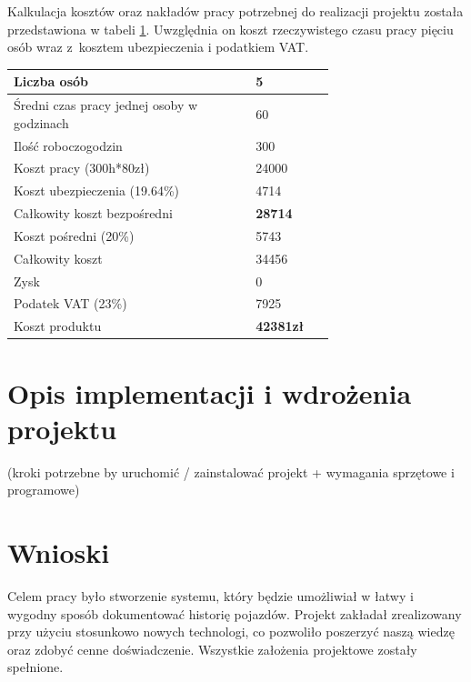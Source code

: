 \documentclass[12pt]{article}
\begin{document}
Kalkulacja kosztów oraz nakładów pracy potrzebnej do realizacji projektu została przedstawiona w tabeli \ref{kosztorys}. Uwzględnia on koszt rzeczywistego czasu pracy pięciu osób wraz z~kosztem ubezpieczenia i podatkiem VAT.

\begin{table}[H]
\begin{center}
\label{kosztorys}
	\begin{tabular}{|p{0.55\linewidth}|p{0.15\linewidth}|}%
	\hline
	Liczba osób 	& 5 				\\ \hline
	Średni czas pracy jednej osoby w godzinach		& 60\\ \hline
	Ilość roboczogodzin & 300	\\ \hline
	Koszt pracy (300h*80zł) & 24000	\\ \hline
	Koszt ubezpieczenia (19.64\%) & 4714	\\ \hline
	Całkowity koszt bezpośredni & \textbf{28714}	\\ \hline
	Koszt pośredni (20\%) & 5743\\ \hline
	Całkowity koszt & 34456\\ \hline
	Zysk & 0\\ \hline
	Podatek VAT (23\%) & 7925\\ \hline
							 \hline
	Koszt produktu & \textbf{42381zł}\\ \hline
	\end{tabular}
\end{center}
\end{table}


\newpage
\section{Opis implementacji i wdrożenia projektu}
(kroki potrzebne by uruchomić / zainstalować projekt + wymagania sprzętowe i programowe)


\newpage
\section{Wnioski}

Celem pracy było stworzenie systemu, który będzie umożliwiał w łatwy i wygodny sposób dokumentować historię pojazdów. Projekt zakładał zrealizowany przy użyciu stosunkowo nowych technologi, co pozwoliło poszerzyć naszą wiedzę oraz zdobyć cenne doświadczenie. Wszystkie założenia projektowe zostały spełnione.
\end{document}
